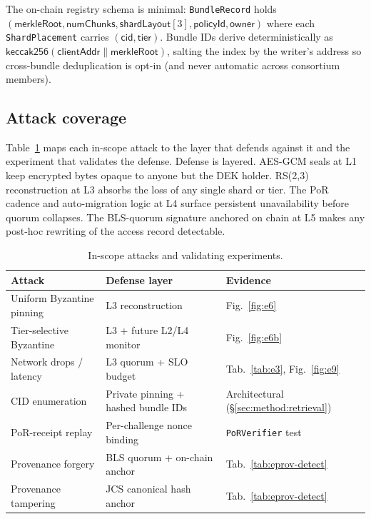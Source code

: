 The on-chain registry schema is minimal: \texttt{BundleRecord} holds $(\textsf{merkleRoot}, \textsf{numChunks}, \textsf{shardLayout}[3], \textsf{policyId}, \textsf{owner})$ where each \texttt{ShardPlacement} carries $(\textsf{cid}, \textsf{tier})$. Bundle IDs derive deterministically as $\textsf{keccak256}(\textsf{clientAddr} \mathbin{\|} \textsf{merkleRoot})$, salting the index by the writer's address so cross-bundle deduplication is opt-in (and never automatic across consortium members).

\subsection{Attack coverage}
\label{sec:method:attacks}

Table~\ref{tab:attacks} maps each in-scope attack to the layer that defends against it and the experiment that validates the defense. Defense is layered. AES-GCM seals at L1 keep encrypted bytes opaque to anyone but the DEK holder. RS(2,3) reconstruction at L3 absorbs the loss of any single shard or tier. The PoR cadence and auto-migration logic at L4 surface persistent unavailability before quorum collapses. The BLS-quorum signature anchored on chain at L5 makes any post-hoc rewriting of the access record detectable.

\begin{table}[!t]
\caption{In-scope attacks and validating experiments.}
\label{tab:attacks}
\centering
\scriptsize
\setlength{\tabcolsep}{4pt}
\begin{tabular}{@{}lll@{}}
\toprule
Attack & Defense layer & Evidence \\
\midrule
Uniform Byzantine pinning  & L3 reconstruction & Fig.~\ref{fig:e6} \\
Tier-selective Byzantine   & L3 + future L2/L4 monitor & Fig.~\ref{fig:e6b} \\
Network drops / latency    & L3 quorum + SLO budget & Tab.~\ref{tab:e3}, Fig.~\ref{fig:e9} \\
CID enumeration            & Private pinning + hashed bundle IDs & Architectural (\S\ref{sec:method:retrieval}) \\
PoR-receipt replay         & Per-challenge nonce binding & \texttt{PoRVerifier} test \\
Provenance forgery         & BLS quorum + on-chain anchor & Tab.~\ref{tab:eprov-detect} \\
Provenance tampering       & JCS canonical hash anchor & Tab.~\ref{tab:eprov-detect} \\
\bottomrule
\end{tabular}
\end{table}

